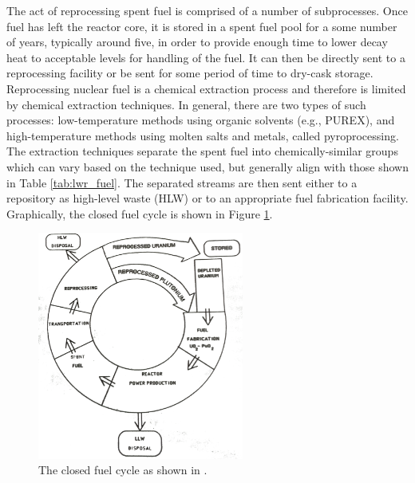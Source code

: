 The act of reprocessing spent fuel is comprised of a number of
subprocesses. Once fuel has left the reactor core, it is stored in a spent fuel
pool for a some number of years, typically around five, in order to provide
enough time to lower decay heat to acceptable levels for handling of the
fuel. It can then be directly sent to a reprocessing facility or be sent for
some period of time to dry-cask storage. Reprocessing nuclear fuel is a chemical
extraction process and therefore is limited by chemical extraction
techniques. In general, there are two types of such processes: low-temperature
methods using organic solvents (e.g., PUREX), and high-temperature methods using
molten salts and metals, called pyroprocessing. The extraction techniques
separate the spent fuel into chemically-similar groups which can vary based on
the technique used, but generally align with those shown in Table
\ref{tab:lwr_fuel}. The separated streams are then sent either to a repository
as high-level waste (HLW) or to an appropriate fuel fabrication
facility. Graphically, the closed fuel cycle is shown in Figure
\ref{fig:closed-cycle}.

\begin{figure}[]
  \begin{center}
    \includegraphics[height=7.5cm]{./chapters/intro/closed_cycle.png}
  \caption{The closed fuel cycle as shown in \cite{cochran1990nuclear}.}
  \label{fig:closed-cycle}
  \end{center}
\end{figure}



